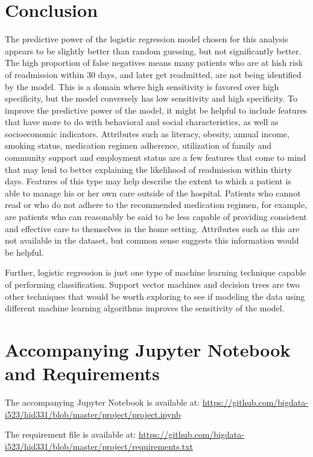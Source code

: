 \documentclass[sigconf]{acmart}
\begin{document}
\section{Conclusion}

The predictive power of the logistic regression model chosen for this analysis appears to be slightly better than random guessing, but not significantly better. The high proportion of false negatives means many patients who are at hish risk of readmission within 30 days, and later get readmitted, are not being identified by the model. This is a domain where high sensitivity is favored over high specificity, but the model conversely has low sensitivity and high specificity. To improve the predictive power of the model, it might be helpful to include features that have more to do with behavioral and social characteristics, as well as socioeconomic indicators. Attributes such as literacy, obesity, annual income, smoking status, medication regimen adherence, utilization of family and community support and employment status are a few features that come to mind that may lend to better explaining the likelihood of readmission within thirty days. Features of this type may help describe the extent to which a patient is able to manage his or her own care outside of the hospital. Patients who cannot read or who do not adhere to the recommended medication regimen, for example, are patients who can reasonably be said to be less capable of providing consistent and effective care to themselves in the home setting. Attributes such as this are not available in the dataset, but common sense suggests this information would be helpful.

Further, logistic regression is just one type of machine learning technique capable of performing classification. Support vector machines and decision trees are two other techniques that would be worth exploring to see if modeling the data using different machine learning algorithms improves the sensitivity of the model.

\appendix

\section{Accompanying Jupyter Notebook and Requirements}
The accompanying Jupyter Notebook is available at: \url{https://github.com/bigdata-i523/hid331/blob/master/project/project.ipynb}

The requirement file is available at: \url{https://github.com/bigdata-i523/hid331/blob/master/project/requirements.txt}
\end{document}
